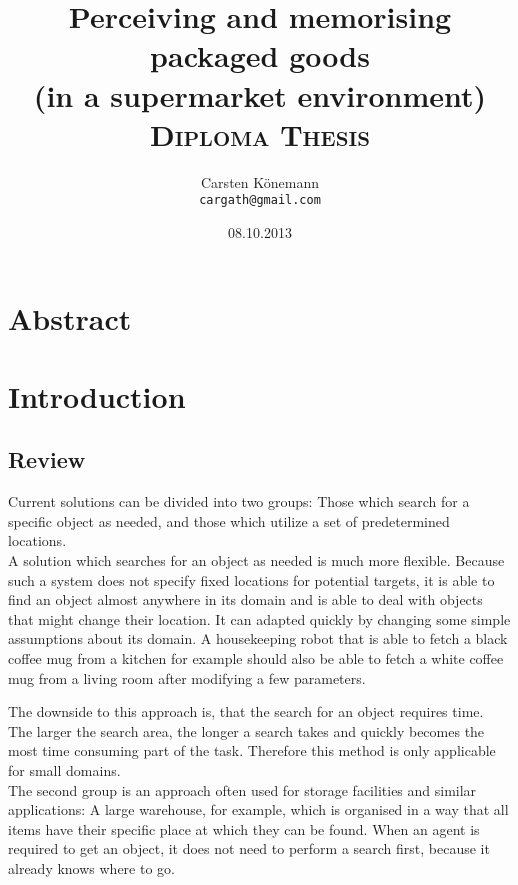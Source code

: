 \documentclass[11pt, twoside, a4paper]{report}
\begin{document}
\title{\textbf{Perceiving and memorising packaged goods} \\ (in a supermarket environment) \\ \vspace{7.5mm} \textsc{Diploma Thesis}}
\author{Carsten K\"onemann \\ \texttt{cargath@gmail.com}}
\date{08.10.2013}

\maketitle

\chapter{Abstract}

\tableofcontents

\chapter{Introduction}

\section{Review}
Current solutions can be divided into two groups: Those which search for a specific object as needed, and those which utilize a set of predetermined locations. \\

A solution which searches for an object as needed is much more flexible. Because such a system does not specify fixed locations for potential targets, it is able to find an object almost anywhere in its domain and is able to deal with objects that might change their location. It can adapted quickly by changing some simple assumptions about its domain. A housekeeping robot that is able to fetch a black coffee mug from a kitchen for example should also be able to fetch a white coffee mug from a living room after modifying a few parameters.

The downside to this approach is, that the search for an object requires time. The larger the search area, the longer a search takes and quickly becomes the most time consuming part of the task. Therefore this method is only applicable for small domains. \\

The second group is an approach often used for storage facilities and similar applications: A large warehouse, for example, which is organised in a way that all items have their specific place at which they can be found. When an agent is required to get an object, it does not need to perform a search first, because it already knows where to go.
\end{document}
